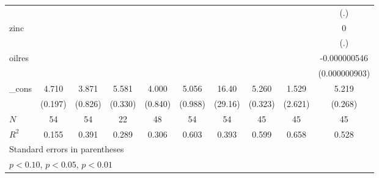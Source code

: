 {\begin{tabular}{l*{9}{c}}
            &                     &                     &                     &                     &                     &                     &                     &                     &         (.)         \\
[1em]
zinc        &                     &                     &                     &                     &                     &                     &                     &                     &           0         \\
            &                     &                     &                     &                     &                     &                     &                     &                     &         (.)         \\
[1em]
oilres      &                     &                     &                     &                     &                     &                     &                     &                     &-0.000000546         \\
            &                     &                     &                     &                     &                     &                     &                     &                     &(0.000000903)         \\
[1em]
\_cons      &       4.710\sym{***}&       3.871\sym{***}&       5.581\sym{***}&       4.000\sym{***}&       5.056\sym{***}&       16.40         &       5.260\sym{***}&       1.529         &       5.219\sym{***}\\
            &     (0.197)         &     (0.826)         &     (0.330)         &     (0.840)         &     (0.988)         &     (29.16)         &     (0.323)         &     (2.621)         &     (0.268)         \\
\hline
\(N\)       &          54         &          54         &          22         &          48         &          54         &          54         &          45         &          45         &          45         \\
\(R^{2}\)   &       0.155         &       0.391         &       0.289         &       0.306         &       0.603         &       0.393         &       0.599         &       0.658         &       0.528         \\
\hline\hline
\multicolumn{10}{l}{\footnotesize Standard errors in parentheses}\\
\multicolumn{10}{l}{\footnotesize \sym{*} \(p<0.10\), \sym{**} \(p<0.05\), \sym{***} \(p<0.01\)}\\
\end{tabular}
}
